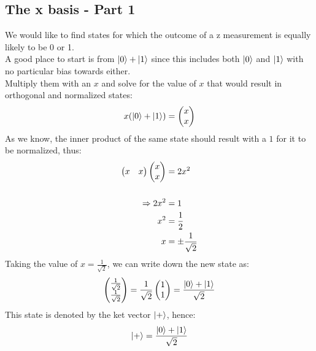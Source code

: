 \documentclass[hidelinks, a4paper, 12pt]{article}
\newcommand{\n}{\\[\baselineskip]}
\newcommand{\thus}{\Rightarrow}
\begin{document}
        \subsection{The x basis - Part 1}
            We would like to find states for which the outcome of a z measurement is equally likely to be 0 or 1.\n
            A good place to start is from $\ket{0} + \ket{1}$ since this includes both $\ket{0}$ and $\ket{1}$ with no particular bias towards either.\n
            Multiply them with an $x$ and solve for the value of $x$ that would result in orthogonal and normalized states:
            \[x(\ket{0} + \ket{1}) = \begin{pmatrix} x \\ x \end{pmatrix}\]
            As we know, the inner product of the same state should result with a $1$ for it to be normalized, thus:
            \[\begin{split}
                \begin{pmatrix} x & x \end{pmatrix} \begin{pmatrix} x \\ x \end{pmatrix} &= 2x^2\n
                \thus 2x^2 &= 1\\
                x^2 &= \frac{1}{2}\\
                x &= \pm \frac{1}{\sqrt{2}}
            \end{split}\]
            Taking the value of $x = \frac{1}{\sqrt{2}}$, we can write down the new state as:
            \[\begin{pmatrix} \frac{1}{\sqrt{2}} \\ \frac{1}{\sqrt{2}} \end{pmatrix} = \frac{1}{\sqrt{2}} \begin{pmatrix} 1 \\ 1 \end{pmatrix} = \frac{\ket{0} + \ket{1}}{\sqrt{2}}\]
            This state is denoted by the ket vector $\ket{+}$, hence:
            \[\ket{+} = \frac{\ket{0} + \ket{1}}{\sqrt{2}}\]
\end{document}
